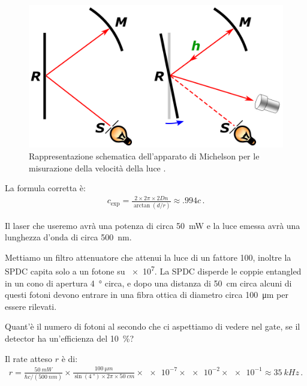 \documentclass[a4paper,12pt]{article}
\begin{document}
\begin{figure}[ht]
\centering
\includegraphics[width=\textwidth]{Speed_of_light_calculation_using_Foucault's_rotating_mirror.png}
\caption{Rappresentazione schematica dell'apparato di Michelson per le misurazione della velocità della luce \cite[]{aurantiacaSpeedLightCalculation2015}.
}
\label{fig:michelson-apparatus}
\end{figure}

La formula corretta è: 
%
\begin{align}
c _{\text{exp}} = \frac{2 \times 2 \pi \times 2 D n}{\arctan(d / r)} \approx \num{.994} c
\,.
\end{align}

\begin{exo}
Il laser che useremo avrà una potenza di circa \SI{50}{mW} e la luce emessa avrà una lunghezza d'onda di circa \SI{500}{nm}. 

Mettiamo un filtro attenuatore che attenui la luce di un fattore 100, inoltre la SPDC capita solo a un fotone su \num{e7}.
La SPDC disperde le coppie entangled in un cono di apertura \SI{4}{\degree} circa, e dopo una distanza di \SI{50}{cm} circa alcuni di questi fotoni devono entrare in una fibra ottica di diametro circa \SI{100}{\micro m} per essere rilevati. 

Quant'è il numero di fotoni al secondo che ci aspettiamo di vedere nel gate, se il detector ha un'efficienza del \SI{10}{\percent}?
\end{exo}

Il rate atteso \(r\) è di:
%
\begin{align}
r = \frac{\SI{50}{mW}}{\hbar c / (\SI{500}{nm})}
\times 
\frac{\SI{100}{\micro m}}{\sin(\SI{4}{\degree}) \times 2 \pi  \times \SI{50}{cm}}
\times \num{e-7} \times \num{e-2} \times \num{e-1} \approx \SI{35}{kHz} 
\,.
\end{align}
%
\end{document}

